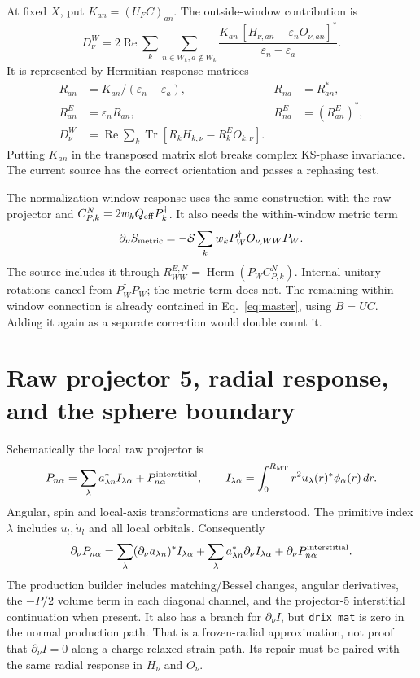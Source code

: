 \documentclass[11pt]{article}
\newcommand{\Tr}{\operatorname{Tr}}
\newcommand{\Rea}{\operatorname{Re}}
\newcommand{\Herm}{\operatorname{Herm}}
\newcommand{\dd}{\partial_\nu}
\newcommand{\Sym}{\mathcal S}
\begin{document}
At fixed $X$, put $K_{an}=(U_F C)_{an}$. The outside-window contribution is
\begin{equation}
D^{W}_\nu=2\Rea\sum_k\sum_{n\in W_k,a\notin W_k}
  \frac{K_{an}\,[H_{\nu,an}-\varepsilon_nO_{\nu,an}]^*}
       {\varepsilon_n-\varepsilon_a}.\label{eq:window}
\end{equation}
It is represented by Hermitian response matrices
\begin{align}
R_{an}&=K_{an}/(\varepsilon_n-\varepsilon_a),&R_{na}&=R_{an}^*,\\
R^E_{an}&=\varepsilon_nR_{an},&R^E_{na}&=(R^E_{an})^*,\\
D^{W}_\nu&=\Rea\sum_k\Tr[R_k H_{k,\nu}-R^E_k O_{k,\nu}].
\end{align}
Putting $K_{an}$ in the transposed matrix slot breaks complex KS-phase
invariance. The current source has the correct orientation and passes a
rephasing test.

The normalization window response uses the same construction with the raw
projector and $C^{N}_{P,k}=2w_kQ_{\rm eff}P_k^\dagger$. It also needs the
within-window metric term
\begin{equation}
\dd S_{\rm metric}=-\Sym\sum_k w_kP_W^\dagger O_{\nu,WW}P_W.
\label{eq:normmetric}
\end{equation}
The source includes it through $R^{E,N}_{WW}=\Herm(P_W C^N_{P,k})$.
Internal unitary rotations cancel from $P_W^\dagger P_W$; the metric term
does not. The remaining within-window connection is already contained in
Eq.~\eqref{eq:master}, using $B=UC$. Adding it again as a separate correction
would double count it.

\section{Raw projector 5, radial response, and the sphere boundary}
Schematically the local raw projector is
\begin{equation}
P_{n\alpha}=\sum_{\lambda}a_{\lambda n}^* I_{\lambda\alpha}
                 +P^{\rm interstitial}_{n\alpha},\qquad
I_{\lambda\alpha}=\int_0^{R_{\rm MT}}r^2
 u_\lambda(r)^*\phi_\alpha(r)\,dr .
\end{equation}
Angular, spin and local-axis transformations are understood. The primitive
index $\lambda$ includes $u_l,\dot u_l$ and all local orbitals. Consequently
\begin{equation}
\dd P_{n\alpha}=
\sum_\lambda(\dd a_{\lambda n})^* I_{\lambda\alpha}
 +\sum_\lambda a_{\lambda n}^*\dd I_{\lambda\alpha}
 +\dd P^{\rm interstitial}_{n\alpha}.\label{eq:radial}
\end{equation}
The production builder includes matching/Bessel changes, angular derivatives,
the $-P/2$ volume term in each diagonal channel, and the projector-5
interstitial continuation when present. It also has a branch for
$\dd I$, but \texttt{drix\_mat} is zero in the normal production path.
That is a frozen-radial approximation, not proof that $\dd I=0$ along a
charge-relaxed strain path. Its repair must be paired with the same radial
response in $H_\nu$ and $O_\nu$.
\end{document}
